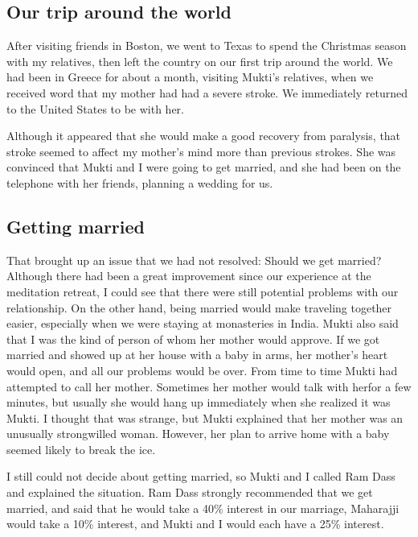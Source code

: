\documentclass[a5paper,10pt,english]{book}
\begin{document}
\subsection{Our trip around the world}
\label{\detokenize{psychopaths:our-trip-around-the-world}}
\sphinxAtStartPar
After visiting friends in Boston, we went to Texas to spend the
Christmas season with my relatives, then left the country on our first
trip around the world. We had been in Greece for about a month, visiting
Mukti’s relatives, when we received word that my mother had had a severe
stroke. We immediately returned to the United States to be with her.

\sphinxAtStartPar
Although it appeared that she would make a good recovery from paralysis,
that stroke seemed to affect my mother’s mind more than previous
strokes. She was convinced that Mukti and I were going to get married,
and she had been on the telephone with her friends, planning a wedding
for us.


\subsection{Getting married}
\label{\detokenize{psychopaths:getting-married}}
\sphinxAtStartPar
That brought up an issue that we had not resolved: Should we get
married? Although there had been a great improvement since our
experience at the meditation retreat, I could see that there were still
potential problems with our relationship. On the other hand, being
married would make traveling together easier, especially when we were
staying at monasteries in India. Mukti also said that I was the kind of
person of whom her mother would approve. If we got married and showed up
at her house with a baby in arms, her mother’s heart would open, and all
our problems would be over. From time to time Mukti had attempted to
call her mother. Sometimes her mother would talk with her\sphinxhyphen{}for a few
minutes, but usually she would hang up immediately when she realized it
was Mukti. I thought that was strange, but Mukti explained that her
mother was an unusually strong\sphinxhyphen{}willed woman. However, her plan to arrive
home with a baby seemed likely to break the ice.

\sphinxAtStartPar
I still could not decide about getting married, so Mukti and I called
Ram Dass and explained the situation. Ram Dass strongly recommended that
we get married, and said that he would take a 40\% interest in our
marriage, Maharajji would take a 10\% interest, and Mukti and I would
each have a 25\% interest.
\end{document}
